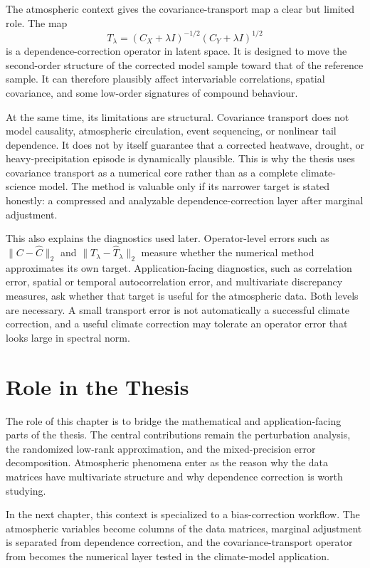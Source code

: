 The atmospheric context gives the covariance-transport map a clear but limited
role. The map
\[
	T_\lambda
	=
	(C_X+\lambda I)^{-1/2}(C_Y+\lambda I)^{1/2}
\]
is a dependence-correction operator in latent space. It is designed to move the
second-order structure of the corrected model sample toward that of the
reference sample. It can therefore plausibly affect intervariable correlations,
spatial covariance, and some low-order signatures of compound behaviour.

At the same time, its limitations are structural. Covariance transport does not
model causality, atmospheric circulation, event sequencing, or nonlinear tail
dependence. It does not by itself guarantee that a corrected heatwave, drought,
or heavy-precipitation episode is dynamically plausible. This is why the thesis
uses covariance transport as a numerical core rather than as a complete
climate-science model. The method is valuable only if its narrower target is
stated honestly: a compressed and analyzable dependence-correction layer after
marginal adjustment.

This also explains the diagnostics used later. Operator-level errors such as
\(\|C-\widehat C\|_2\) and
\(\|T_\lambda-\widehat T_\lambda\|_2\) measure whether the numerical method
approximates its own target. Application-facing diagnostics, such as correlation
error, spatial or temporal autocorrelation error, and multivariate discrepancy
measures, ask whether that target is useful for the atmospheric data. Both levels
are necessary. A small transport error is not automatically a successful climate
correction, and a useful climate correction may tolerate an operator error that
looks large in spectral norm.

\section{Role in the Thesis}

The role of this chapter is to bridge the mathematical and application-facing
parts of the thesis. The central contributions remain the perturbation analysis,
the randomized low-rank approximation, and the mixed-precision error
decomposition. Atmospheric phenomena enter as the reason why the data matrices
have multivariate structure and why dependence correction is worth studying.

In the next chapter, this context is specialized to a bias-correction workflow.
The atmospheric variables become columns of the data matrices, marginal
adjustment is separated from dependence correction, and the covariance-transport
operator from  becomes the numerical layer tested in
the climate-model application.
